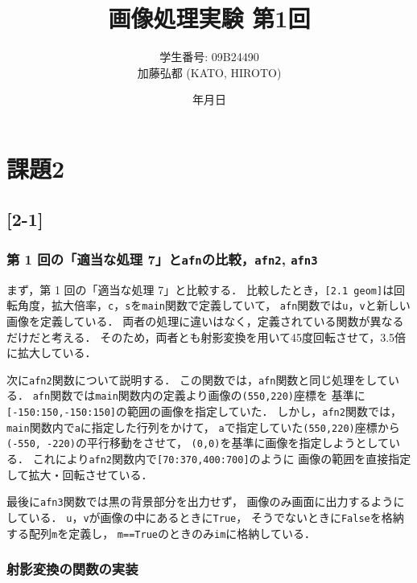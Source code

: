 \documentclass[autodetect-engine,dvi=dvipdfmx,ja=standard,
               a4j,11pt]{bxjsarticle}
\title{画像処理実験 第1回}
\author{学生番号: 09B24490\\
        加藤弘都 (KATO, HIROTO)}
\date{\number\year 年\number\month 月\number\day 日}
\begin{document}
\maketitle

\section{課題2} \label{sec:abstract}

\subsection{[2-1]}
\subsubsection{第 1 回の「適当な処理 7」と\texttt{afn}の比較，\texttt{afn2}, \texttt{afn3}}

まず，第 1 回の「適当な処理 7」と比較する．
比較したとき，\verb|[2.1 geom]|は回転角度，拡大倍率，\verb|c|，\verb|s|を\verb|main|関数で定義していて，
\verb|afn|関数では\verb|u|，\verb|v|と新しい画像を定義している．
両者の処理に違いはなく，定義されている関数が異なるだけだと考える．
そのため，両者とも射影変換を用いて45度回転させて，3.5倍に拡大している．

次に\verb|afn2|関数について説明する．
この関数では，\verb|afn|関数と同じ処理をしている．
\verb|afn|関数では\verb|main|関数内の定義より画像の\verb|(550,220)|座標を
基準に\verb|[-150:150,-150:150]|の範囲の画像を指定していた．
しかし，\verb|afn2|関数では，\verb|main|関数内で\verb|a|に指定した行列をかけて，
\verb|a|で指定していた\verb|(550,220)|座標から\verb|(-550, -220)|の平行移動をさせて，
\verb|(0,0)|を基準に画像を指定しようとしている．
これにより\verb|afn2|関数内で\verb|[70:370,400:700]|のように
画像の範囲を直接指定して拡大・回転させている．

最後に\verb|afn3|関数では黒の背景部分を出力せず，
画像のみ画面に出力するようにしている．
\verb|u|，\verb|v|が画像の中にあるときに\verb|True|，
そうでないときに\verb|False|を格納する配列\verb|m|を定義し，
\verb|m==True|のときのみ\verb|im|に格納している．\verb||\verb||

\subsubsection{射影変換の関数の実装}
\end{document}
